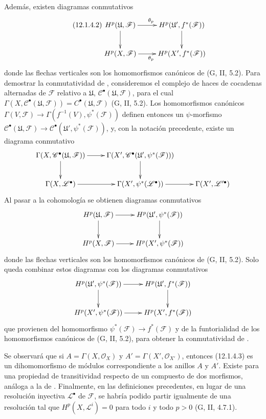 \begin{env}[12.1.4]
Además, existen diagramas conmutativos
\[
\label{0.12.1.4.2-fr}
\tag{12.1.4.2}
\xymatrix{
H^p(\mathfrak U,\mathcal F)\ar[r]^{\theta_p}\ar[d]
&H^p(\mathfrak U',f^*(\mathcal F))\ar[d]\\
H^p(X,\mathcal F)\ar[r]_{\theta_p}
&H^p(X',f^*(\mathcal F))
}
\]
donde las flechas verticales son los homomorfismos canónicos de
(G, II, 5.2).
Para demostrar la conmutatividad de , consideremos el
complejo de haces de cocadenas alternadas de $\mathcal F$ relativo a
$\mathfrak U$,
$\mathcal C^\bullet(\mathfrak U,\mathcal F)$, para el cual
$\Gamma(X,\mathcal C^\bullet(\mathfrak U,\mathcal F))=
C^\bullet(\mathfrak U,\mathcal F)$
(G, II, 5.2).
Los homomorfismos canónicos
$\Gamma(V,\mathcal F)\to
\Gamma(f^{-1}(V),\psi^*(\mathcal F))$
definen entonces un $\psi$-morfismo
$\mathcal C^\bullet(\mathfrak U,\mathcal F)\to
\mathcal C^\bullet(\mathfrak U',\psi^*(\mathcal F))$,
y, con la notación precedente, existe un diagrama conmutativo
\[
\xymatrix{
\Gamma(X,\mathcal C^\bullet(\mathfrak U,\mathcal F))\ar[r]\ar[d]
&\Gamma(X',\mathcal C^\bullet(\mathfrak U',\psi^*(\mathcal F)))\ar[d]\\
\Gamma(X,\mathcal L^\bullet)\ar[r]
&\Gamma(X',\psi^*(\mathcal L^\bullet))\ar[r]
&\Gamma(X',\mathcal L'^\bullet)
}
\]
Al pasar a la cohomología se obtienen diagramas conmutativos
\[
\xymatrix{
H^p(\mathfrak U,\mathcal F)\ar[r]\ar[d]
&H^p(\mathfrak U',\psi^*(\mathcal F))\ar[d]\\
H^p(X,\mathcal F)\ar[r]
&H^p(X',\psi^*(\mathcal F))
}
\]
donde las flechas verticales son los homomorfismos canónicos de
(G, II, 5.2).
Solo queda combinar estos diagramas con los diagramas conmutativos
\[
\xymatrix{
H^p(\mathfrak U',\psi^*(\mathcal F))\ar[r]\ar[d]
&H^p(\mathfrak U',f^*(\mathcal F))\ar[d]\\
H^p(X',\psi^*(\mathcal F))\ar[r]
&H^p(X',f^*(\mathcal F))
}
\]
que provienen del homomorfismo
$\psi^*(\mathcal F)\to f^*(\mathcal F)$ y de la funtorialidad de los
homomorfismos canónicos de (G, II, 5.2), para obtener la conmutatividad
de .

Se observará que si
$A=\Gamma(X,\mathcal O_X)$ y $A'=\Gamma(X',\mathcal O_{X'})$, entonces
(12.1.4.3) es un dihomomorfismo de módulos correspondiente a
los anillos $A$ y $A'$.
Existe para  una propiedad de transitividad respecto
de un compuesto de dos morfismos, análoga a la de
.
Finalmente, en las definiciones precedentes, en lugar de una resolución
inyectiva $\mathcal L^\bullet$ de $\mathcal F$, se habría podido partir igualmente de una resolución tal que $H^p(X,\mathcal L^i)=0$ para todo $i$ y todo $p>0$ (G, II, 4.7.1).
\end{env}

